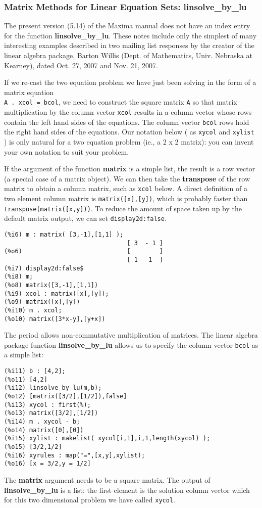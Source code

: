 \documentclass[12pt]{article}
\begin{document}
\subsubsection{Matrix Methods for Linear Equation Sets: linsolve\_by\_lu}
The present version (5.14) of the Maxima manual does not have an index entry
  for the function \textbf{linsolve\_by\_lu}.
These notes include only the simplest of many interesting examples described
  in two mailing list responses by the creator of the linear algebra package,
  Barton Willis (Dept. of Mathematics, Univ. Nebraska at Kearney),
  dated Oct. 27, 2007 and Nov. 21, 2007.
 
 \smallskip
 
If we re-cast the two equation problem we have just been solving 
  in the form of a matrix equation\\
  \verb|A . xcol = bcol|, we need
  to construct the square matrix \verb|A| so that matrix multiplication by the column
  vector \verb|xcol| results in a column vector whose rows contain the left hand sides
  of the equations.
The column vector \verb|bcol| rows hold the right hand sides of the equations.
Our notation below ( as \verb|xycol| and \verb|xylist| ) is only natural for a two equation
  problem (ie., a 2 x 2 matrix): you can invent your own notation to suit
  your problem.

\smallskip
If the argument of the function \textbf{matrix} is a simple list, the result is a
    row vector (a special case of a matrix object).
We can then take the \textbf{transpose} of the row matrix to obtain a column matrix,
   such as \verb|xcol| below.
A direct definition of a two element column matrix is \verb|matrix([x],[y])|, which
  is probably faster than \verb|transpose(matrix([x,y]))|.   
To reduce the amount of space taken up by the default matrix output, we
  can set \verb|display2d:false|.
\small
\begin{verbatim}
(%i6) m : matrix( [3,-1],[1,1] );
                                  [ 3  - 1 ]
(%o6)                             [        ]
                                  [ 1   1  ]
(%i7) display2d:false$
(%i8) m;
(%o8) matrix([3,-1],[1,1])
(%i9) xcol : matrix([x],[y]);
(%o9) matrix([x],[y])
(%i10) m . xcol;
(%o10) matrix([3*x-y],[y+x])
\end{verbatim}
\normalsize
The period allows non-commutative multiplication of matrices.
The linear algebra package function \textbf{linsolve\_by\_lu} allows us to specify
  the column vector \verb|bcol| as a simple list:
\small
\begin{verbatim}
(%i11) b : [4,2];
(%o11) [4,2]
(%i12) linsolve_by_lu(m,b);
(%o12) [matrix([3/2],[1/2]),false]
(%i13) xycol : first(%);
(%o13) matrix([3/2],[1/2])
(%i14) m . xycol - b;
(%o14) matrix([0],[0])
(%i15) xylist : makelist( xycol[i,1],i,1,length(xycol) );
(%o15) [3/2,1/2]
(%i16) xyrules : map("=",[x,y],xylist);
(%o16) [x = 3/2,y = 1/2]
\end{verbatim}
\normalsize
The \textbf{matrix} argument needs to be a square matrix.
The output of \textbf{linsolve\_by\_lu} is a list: the first element is the solution
  column vector  which for this two dimensional problem we have called \verb|xycol|.
\end{document}
